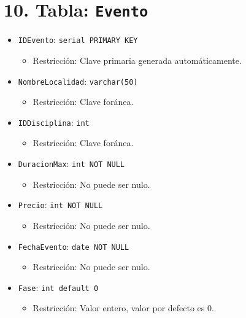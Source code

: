 \section*{10. Tabla: \texttt{Evento}}
\begin{itemize}
    \item \texttt{IDEvento}: \texttt{serial PRIMARY KEY}
    \begin{itemize}
        \item Restricción: Clave primaria generada automáticamente.
    \end{itemize}
    \item \texttt{NombreLocalidad}: \texttt{varchar(50)}
    \begin{itemize}
        \item Restricción: Clave foránea.
    \end{itemize}
    \item \texttt{IDDisciplina}: \texttt{int}
    \begin{itemize}
        \item Restricción: Clave foránea.
    \end{itemize}
    \item \texttt{DuracionMax}: \texttt{int NOT NULL}
    \begin{itemize}
        \item Restricción: No puede ser nulo.
    \end{itemize}
    \item \texttt{Precio}: \texttt{int NOT NULL}
    \begin{itemize}
        \item Restricción: No puede ser nulo.
    \end{itemize}
    \item \texttt{FechaEvento}: \texttt{date NOT NULL}
    \begin{itemize}
        \item Restricción: No puede ser nulo.
    \end{itemize}
    \item \texttt{Fase}: \texttt{int default 0}
    \begin{itemize}
        \item Restricción: Valor entero, valor por defecto es 0.
    \end{itemize}
\end{itemize}

